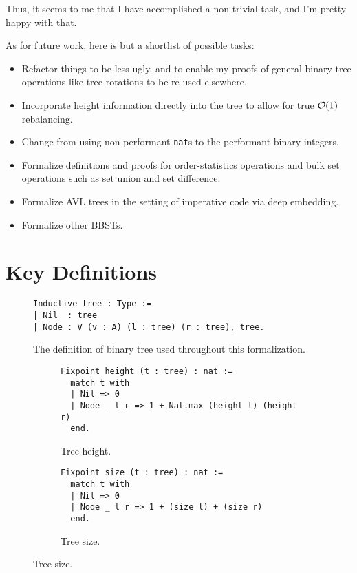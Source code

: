 \documentclass[acmsmall, authorversion, nonacm, overload]{acmart}
\DeclareRobustCommand{\bigO}{%
  \text{\usefont{OMS}{cmsy}{m}{n}O}%
}
\begin{document}
Thus, it seems to me that I have accomplished a non-trivial task, and I'm pretty happy with that.

As for future work, here is but a shortlist of possible tasks:
\begin{itemize}
\item Refactor things to be less ugly, and to enable my proofs of
  general binary tree operations like tree-rotations to be re-used elsewhere.
\item Incorporate height information directly into the tree
  to allow for true $\bigO(1)$ rebalancing.
\item Change from using non-performant \verb|nat|s to
  the performant binary integers.
\item Formalize definitions and proofs for order-statistics operations and
  bulk set operations such as set union and set difference.
\item Formalize AVL trees in the setting of imperative code
  via deep embedding.
\item Formalize other BBSTs.
\end{itemize}




\appendix

\section{Key Definitions}
\phantom{AAAA}

\begin{figure}[h!]
\begin{verbatim}
Inductive tree : Type :=
| Nil  : tree
| Node : ∀ (v : A) (l : tree) (r : tree), tree.
\end{verbatim}
\caption*{The definition of binary tree used throughout this formalization.}
\end{figure}

\begin{figure}[h!]
  \begin{subfigure}{0.5\textwidth}
    \centering
\begin{verbatim}
Fixpoint height (t : tree) : nat :=
  match t with
  | Nil => 0
  | Node _ l r => 1 + Nat.max (height l) (height r)
  end.
\end{verbatim}
  \caption*{Tree height.}
  \end{subfigure}%
  \begin{subfigure}{0.5\textwidth}
  \begin{verbatim}
Fixpoint size (t : tree) : nat :=
  match t with
  | Nil => 0
  | Node _ l r => 1 + (size l) + (size r)
  end.
\end{verbatim}
  \caption*{Tree size.}
  \end{subfigure}
\end{figure}
\end{document}
